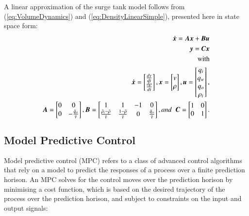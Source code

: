 \documentclass[preprint,authoryear,12pt]{elsarticle}
\begin{document}
A linear approximation of the surge tank model follows from (\ref{eq:VolumeDynamics}) and (\ref{eq:DensityLinearSimple}), presented here in state space form:
\begin{align}
	\begin{split}
	\boldsymbol{\dot{x}} = \boldsymbol{A}\boldsymbol{x} + \boldsymbol{B}\boldsymbol{u} \\
	\boldsymbol{y} = \boldsymbol{C}\boldsymbol{x}\\
	\text{with} \\
	\boldsymbol{\dot{x}} = \begin{bmatrix} \frac{dv}{dt} \\ \frac{d\rho}{dt} \end{bmatrix}, \boldsymbol{x} = \begin{bmatrix} v \\ \rho \end{bmatrix}, \boldsymbol{u} = \begin{bmatrix} q_i \\ q_w \\ q_o \\ \rho_i \end{bmatrix}, \\ 
	\boldsymbol{A} = \begin{bmatrix} 0 & 0 \\ 0 & -\frac{\bar{q}_o}{\bar{v}}  \end{bmatrix}, 
	\boldsymbol{B} = \begin{bmatrix} 1 & 1 & -1 & 0 \\ \frac{\bar{\rho}_i - \bar{\rho}}{\bar{v}} & \frac{1 - \bar{\rho}}{\bar{v}} & 0 & \frac{\bar{q}_o}{\bar{v}} \end{bmatrix}, and \hspace{2mm}
	\boldsymbol{C} = \begin{bmatrix} 1 & 0 \\ 0 & 1  \end{bmatrix}. \\
	\end{split}
	\label{eq:LinearModel}
\end{align}

\subsection{Model Predictive Control}\label{sec:MPC}
Model predictive control (MPC) refers to a class of advanced control algorithms that rely on a model to predict the responses of a process over a finite prediction horison. An MPC solves for the control moves over the prediction horison by minimising a cost function, which is based on the desired trajectory of the process over the prediction horison, and subject to constraints on the input and output signals:
\end{document}
